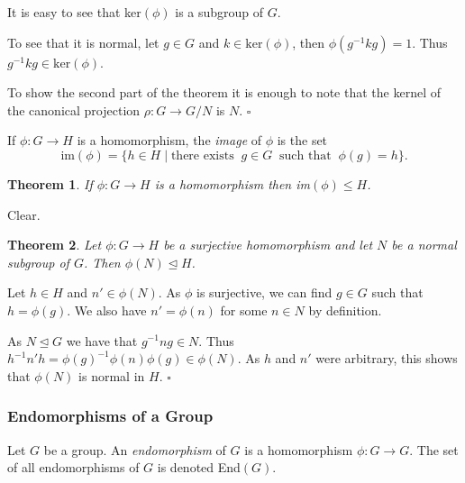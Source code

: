 \documentclass[10pt]{article}
\newtheorem{theorem}{Theorem}[section]
\newenvironment{proof}[1][Proof]{\begin{trivlist}
\item[\hskip \labelsep {\itshape #1}]}{\end{trivlist}}
\newenvironment{definition}[1][Definition]{\begin{trivlist}
\item[\hskip \labelsep {\bfseries #1}]}{\end{trivlist}}
\begin{document}
\begin{proof}
It is easy to see that ker$(\phi)$ is a subgroup of $G$.

To see that it is normal, let $g \in G$ and $k \in \mbox{ker}(\phi)$, then $\phi(g^{-1}kg) = 1$. Thus $g^{-1}kg \in \mbox{ker}(\phi)$.

To show the second part of the theorem it is enough to note that the kernel of the canonical projection $\rho : G \to G/N$ is $N$. $\square$
\end{proof}

\begin{definition}
If $\phi : G \to H$ is a homomorphism, the \emph{image} of $\phi$ is the set
$$\mbox{im}(\phi) = \{h \in H \;|\; \mbox{there exists}\;\; g \in G \;\;\mbox{such that}\;\; \phi(g) = h\}.$$
\end{definition}

\begin{theorem}
If $\phi : G \to H$ is a homomorphism then im$(\phi) \leq H$.
\end{theorem}

\begin{proof}
Clear.
\end{proof}

\begin{theorem}
Let $\phi : G \to H$ be a surjective homomorphism and let $N$ be a normal subgroup of $G$. Then $\phi(N) \mathrel{\unlhd} H$.
\end{theorem}

\begin{proof}
Let $h \in H$ and $n' \in \phi(N)$. As $\phi$ is surjective, we can find $g \in G$ such that $h = \phi(g)$. We also have $n' = \phi(n)$ for some $n \in N$ by definition.

As $N \mathrel{\unlhd} G$ we have that $g^{-1}ng \in N$. Thus $h^{-1}n'h = \phi(g)^{-1}\phi(n)\phi(g) \in \phi(N)$. As $h$ and $n'$ were arbitrary, this shows that $\phi(N)$ is normal in $H$. $\square$
\end{proof}

\subsubsection{Endomorphisms of a Group}

\begin{definition}
Let $G$ be a group. An \emph{endomorphism} of $G$ is a homomorphism $\phi : G \to G$. The set of all endomorphisms of $G$ is denoted End$(G)$.
\end{definition}
\end{document}

